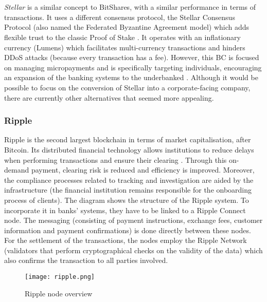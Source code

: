 \documentclass[12pt,twoside]{article}
\begin{document}
\\ \\
\textit{Stellar} is a similar concept to BitShares, with a similar performance in terms of transactions. It uses a different consensus protocol, the Stellar Consensus Protocol (also named the Federated Byzantine Agreement model) which adds flexible trust to the classic Proof of Stake \cite{Stellar:TP}. It operates with an inflationary currency (Lumens) which facilitates multi-currency transactions and hinders DDoS attacks (because every transaction has a fee). However, this BC is focused on managing micropayments and is specifically targeting individuals, encouraging an expansion of the banking systems to the underbanked \cite{Stellar:docs}. Although it would be possible to focus on the conversion of Stellar into a corporate-facing company, there are currently other alternatives that seemed more appealing.

\subsubsection{Ripple}
\label{sub:Ripple}
Ripple is the second largest blockchain in terms of market capitalisation, after Bitcoin. Its distributed financial technology allows institutions to reduce delays when performing transactions and ensure their clearing \cite{Ripple:TP}. Through this on-demand payment, clearing risk is reduced and efficiency is improved. Moreover, the compliance processes related to tracking and investigation are aided by the infrastructure (the financial institution remains responsible for the onboarding process of clients). The diagram shows the structure of the Ripple system. To incorporate it in banks' systems, they have to be linked to a Ripple Connect node. The messaging (consisting of payment instructions, exchange fees, customer information and payment confirmations) is done directly between these nodes. For the settlement of the transactions, the nodes employ the Ripple Network (validators that perform cryptographical checks on the validity of the data) which also confirms the transaction to all parties involved.
\begin{figure}[H]
\centering
\texttt{[image: ripple.png]}
\caption{Ripple node overview \cite{Ripple:TP}}
\centering
\label{fig:Ripple}
\end{figure}
\end{document}
